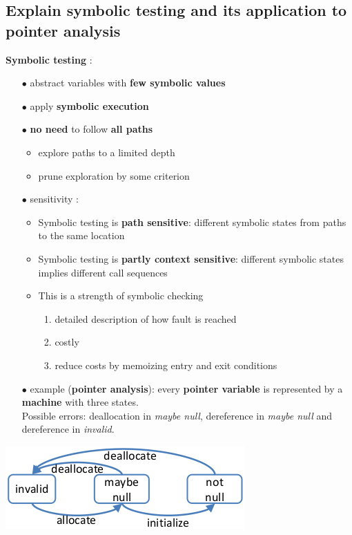 \documentclass{article}
\begin{document}
\subsection{Explain symbolic testing and its application to pointer analysis}
\textbf{Symbolic testing} : 
\begin{itemize}
    \item [$\bullet$] abstract variables with \textbf{few symbolic values}
    \item [$\bullet$] apply \textbf{symbolic execution}
    \item [$\bullet$] \textbf{no need} to follow \textbf{all paths}
    \begin{itemize}
        \item explore paths to a limited depth
        \item prune exploration by some criterion
    \end{itemize}
    \item [$\bullet$] sensitivity :
     \begin{itemize}
        \item Symbolic testing is \textbf{path sensitive}: different symbolic states from paths to the same location
        \item Symbolic testing is \textbf{partly context sensitive}: different symbolic states implies different call sequences
        \item This is a strength of symbolic checking
        \begin{enumerate}
            \item detailed description of how fault is reached
            \item costly
            \item reduce costs by memoizing entry and exit conditions
        \end{enumerate}
    \end{itemize}
    \newpage
    \item [$\bullet$] example (\textbf{pointer analysis}): every \textbf{pointer variable} is represented by a \textbf{machine} with three states.\\
    Possible errors: deallocation in \textit{maybe null}, dereference in \textit{maybe null} and dereference in \textit{invalid}.
\end{itemize}
\begin{center}
    \includegraphics[scale=0.55]{image/pointer_analysis}
\end{center}
\end{document}
